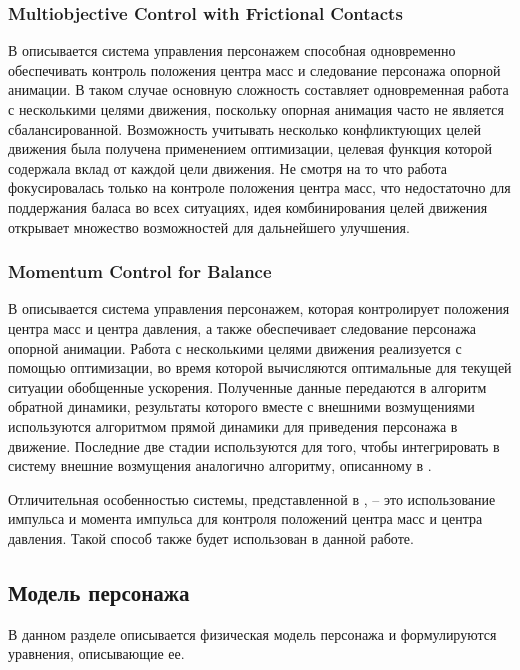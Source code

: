 \subsubsection{Multiobjective Control with Frictional Contacts}

В \cite{AbeSP} описывается система управления персонажем способная одновременно обеспечивать контроль положения центра масс и следование персонажа опорной анимации. В таком случае основную сложность составляет одновременная работа с несколькими целями движения, поскольку опорная анимация часто не является сбалансированной. Возможность учитывать несколько конфликтующих целей движения была получена применением оптимизации, целевая функция которой содержала вклад от каждой цели движения. Не смотря на то что работа фокусировалась только на контроле положения центра масс, что недостаточно для поддержания баласа во всех ситуациях, идея комбинирования целей движения открывает множество возможностей для дальнейшего улучшения.

\subsubsection{Momentum Control for Balance}

В \cite{MacchiettoZS} описывается система управления персонажем, которая контролирует положения центра масс и центра давления, а также обеспечивает следование персонажа опорной анимации. Работа с несколькими целями движения реализуется с помощью оптимизации, во время которой вычисляются оптимальные для текущей ситуации обобщенные ускорения. Полученные данные передаются в алгоритм обратной динамики, результаты которого вместе с внешними возмущениями используются алгоритмом прямой динамики для приведения персонажа в движение. Последние две стадии используются для того, чтобы интегрировать в систему внешние возмущения аналогично алгоритму, описанному в \cite{KudohKI}.

Отличительная особенностью системы, представленной в \cite{MacchiettoZS}, -- это использование импульса и момента импульса для контроля положений центра масс и центра давления. Такой способ также будет использован в данной работе.

\subsection{Модель персонажа}

В данном разделе описывается физическая модель персонажа и формулируются уравнения, описывающие ее.

